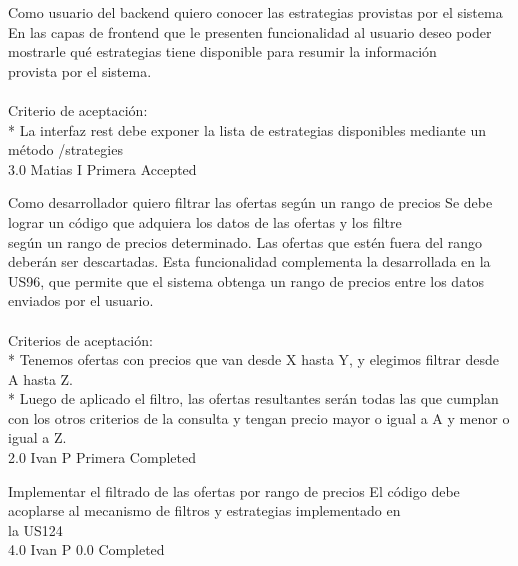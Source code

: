 \vspace{20pt}

	{Como usuario del backend quiero conocer las estrategias provistas por el sistema} %
	{En las capas de frontend que le presenten funcionalidad al usuario deseo poder\\
mostrarle qué estrategias tiene disponible para resumir la información\\
provista por el sistema.\\
  \\
Criterio de aceptación:\\
* La interfaz rest debe exponer la lista de estrategias disponibles mediante un método /strategies\\
} %
	{} %
	{3.0} %
	{Matias I} %
	{Primera} %
	{Accepted} %


\vspace{20pt}

	{Como desarrollador quiero filtrar las ofertas según un rango de precios} %
	{Se debe lograr un código que adquiera los datos de las ofertas y los filtre\\
según un rango de precios determinado. Las ofertas que estén fuera del rango\\
deberán ser descartadas. Esta funcionalidad complementa la desarrollada en la\\
US96, que permite que el sistema obtenga un rango de precios entre los datos\\
enviados por el usuario.\\
  \\
Criterios de aceptación:\\
* Tenemos ofertas con precios que van desde X hasta Y, y elegimos filtrar desde A hasta Z.   \\
* Luego de aplicado el filtro, las ofertas resultantes serán todas las que cumplan con los otros criterios de la consulta y tengan precio mayor o igual a A y menor o igual a Z.  \\
} %
	{} %
	{2.0} %
	{Ivan P} %
	{Primera} %
	{Completed} %

		{Implementar el filtrado de las ofertas por rango de precios} %
		{El código debe acoplarse al mecanismo de filtros y estrategias implementado en\\
la US124\\
} %
		{4.0} %
		{Ivan P} %
		{0.0} %
		{Completed} %


